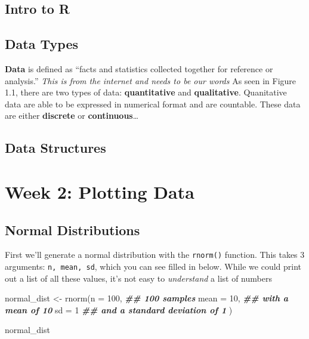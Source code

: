 \documentclass[
]{book}
\newenvironment{Shaded}{\begin{snugshade}}{\end{snugshade}}
\newcommand{\AttributeTok}[1]{\textcolor[rgb]{0.77,0.63,0.00}{#1}}
\newcommand{\DecValTok}[1]{\textcolor[rgb]{0.00,0.00,0.81}{#1}}
\newcommand{\DocumentationTok}[1]{\textcolor[rgb]{0.56,0.35,0.01}{\textbf{\textit{#1}}}}
\newcommand{\FunctionTok}[1]{\textcolor[rgb]{0.00,0.00,0.00}{#1}}
\newcommand{\NormalTok}[1]{#1}
\newcommand{\OtherTok}[1]{\textcolor[rgb]{0.56,0.35,0.01}{#1}}
\begin{document}
\hypertarget{intro-to-r}{%
\subsection{Intro to R}\label{intro-to-r}}

\hypertarget{data-types}{%
\subsection{Data Types}\label{data-types}}

\textbf{Data} is defined as ``facts and statistics collected together for reference or analysis.'' \emph{This is from the internet and needs to be our words} As seen in Figure 1.1, there are two types of data: \textbf{quantitative} and \textbf{qualitative}. Quanitative data are able to be expressed in numerical format and are countable. These data are either \textbf{discrete} or \textbf{continuous}\ldots{}

\hypertarget{data-structures}{%
\subsection{Data Structures}\label{data-structures}}

\hypertarget{week-2-plotting-data}{%
\section{Week 2: Plotting Data}\label{week-2-plotting-data}}

\hypertarget{normal-distributions}{%
\subsection{Normal Distributions}\label{normal-distributions}}

First we'll generate a normal distribution with the \texttt{rnorm()} function. This takes 3 arguments: \texttt{n,\ mean,\ sd}, which you can see filled in below. While we could print out a list of all these values, it's not easy to \emph{understand} a list of numbers

\begin{Shaded}
\begin{Highlighting}[]
\NormalTok{normal\_dist }\OtherTok{\textless{}{-}} \FunctionTok{rnorm}\NormalTok{(}\AttributeTok{n =} \DecValTok{100}\NormalTok{, }\DocumentationTok{\#\# 100 samples}
                     \AttributeTok{mean =} \DecValTok{10}\NormalTok{, }\DocumentationTok{\#\# with a mean of 10}
                     \AttributeTok{sd =} \DecValTok{1} \DocumentationTok{\#\# and a standard deviation of 1}
\NormalTok{                     )}


\NormalTok{normal\_dist}
\end{Highlighting}
\end{Shaded}
\end{document}

